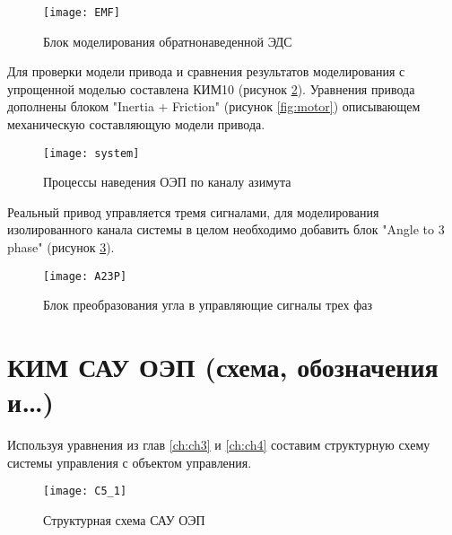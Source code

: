 \begin{figure}[ht]
	\centering
	\texttt{[image: EMF]} 
	\caption{Блок моделирования обратнонаведенной ЭДС}
	\label{fig:EMF}
\end{figure}








\begingroup
\captiondelim{ } %

\endgroup

Для проверки модели привода и сравнения результатов моделирования с упрощенной моделью составлена КИМ10 (рисунок \ref{fig:KIM10}). Уравнения привода дополнены блоком "Inertia + Friction" (рисунок \ref{fig:motor}) описывающем механическую составляющую модели привода.
 
\begin{figure}[ht]
 	\centering
 	\texttt{[image: system]} 
 	\caption{Процессы наведения ОЭП по каналу азимута}
 	\label{fig:KIM10}
\end{figure}

Реальный привод управляется тремя сигналами, для моделирования изолированного канала системы в целом необходимо добавить блок "Angle to 3 phase" (рисунок \ref{fig:a2p}).

\begin{figure}[ht]
	\centering
	\texttt{[image: A23P]} 
	\caption{Блок преобразования угла в управляющие сигналы трех фаз}
	\label{fig:a2p}
\end{figure}


















\section{КИМ САУ ОЭП (схема, обозначения и…) } \label{ch:ch5/sect2}

Используя  уравнения из глав \ref{ch:ch3} и \ref{ch:ch4} составим структурную схему системы управления с объектом управления.
 
\begin{figure}[ht]
	\centering
	\texttt{[image: C5\_1]} 
	\caption{Структурная схема САУ ОЭП}
	\label{fig:structure}
\end{figure}


